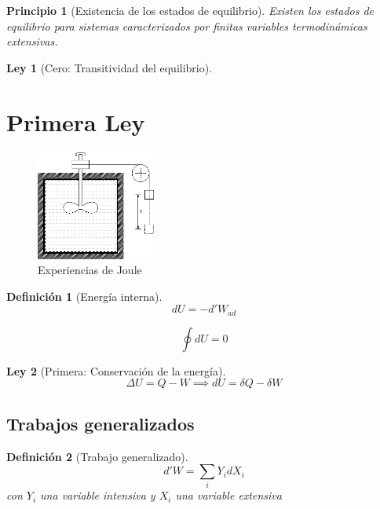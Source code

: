 \documentclass{book}
\numberwithin{equation}{section} %
\newtheorem{definition}{Definición}[chapter]
\newtheorem{law}{Ley}[chapter]
\newtheorem{principle}{Principio}[chapter]
\begin{document}
\begin{principle}[Existencia de los estados de equilibrio]
Existen los estados de equilibrio para sistemas caracterizados por finitas variables termodinámicas extensivas.
\end{principle}


\begin{law}[Cero: Transitividad del equilibrio]
\end{law}

\section{Primera Ley}
\begin{figure}[H]
\centering
\includegraphics[width=0.35\textwidth]{primera_ley}
\caption{Experiencias de Joule}
\label{fig:primera_ley}
\end{figure}
\begin{definition}[Energía interna]

\begin{equation}
dU = - d'W_{ad}
\end{equation}

\begin{equation}
\oint dU = 0
\end{equation}

\end{definition}


\begin{law}[Primera: Conservación de la energía]

\begin{equation}
\Delta U = Q - W \implies dU = \delta Q - \delta W
\end{equation}

\end{law}


\subsection{Trabajos generalizados}

\begin{definition}[Trabajo generalizado]

\begin{equation}
d'W = \sum_i Y_i dX_i
\end{equation}
con $Y_i$ una variable intensiva y $X_i$ una variable extensiva

\end{definition}
\end{document}
